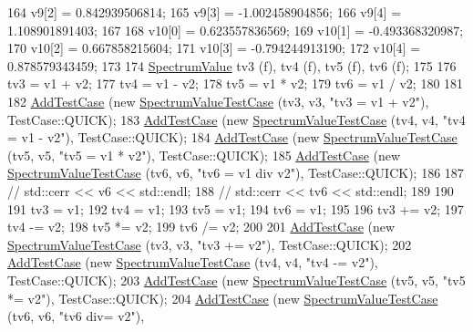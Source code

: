 \begin{DoxyCode}
164   v9[2] =  0.842939506814;
165   v9[3] = -1.002458904856;
166   v9[4] =  1.108901891403;
167 
168   v10[0] =  0.623557836569;
169   v10[1] = -0.493368320987;
170   v10[2] =  0.667858215604;
171   v10[3] = -0.794244913190;
172   v10[4] =  0.878579343459;
173 
174   \hyperlink{classns3_1_1SpectrumValue}{SpectrumValue} tv3 (f), tv4 (f), tv5 (f), tv6 (f);
175 
176   tv3 = v1 + v2;
177   tv4 = v1 - v2;
178   tv5 = v1 * v2;
179   tv6 = v1 / v2;
180 
181 
182   \hyperlink{classns3_1_1TestCase_a3718088e3eefd5d6454569d2e0ddd835}{AddTestCase} (\textcolor{keyword}{new} \hyperlink{classSpectrumValueTestCase}{SpectrumValueTestCase} (tv3, v3, \textcolor{stringliteral}{"tv3 = v1 + v2"}), 
      TestCase::QUICK);
183   \hyperlink{classns3_1_1TestCase_a3718088e3eefd5d6454569d2e0ddd835}{AddTestCase} (\textcolor{keyword}{new} \hyperlink{classSpectrumValueTestCase}{SpectrumValueTestCase} (tv4, v4, \textcolor{stringliteral}{"tv4 = v1 - v2"}), 
      TestCase::QUICK);
184   \hyperlink{classns3_1_1TestCase_a3718088e3eefd5d6454569d2e0ddd835}{AddTestCase} (\textcolor{keyword}{new} \hyperlink{classSpectrumValueTestCase}{SpectrumValueTestCase} (tv5, v5, \textcolor{stringliteral}{"tv5 = v1 * v2"}), 
      TestCase::QUICK);
185   \hyperlink{classns3_1_1TestCase_a3718088e3eefd5d6454569d2e0ddd835}{AddTestCase} (\textcolor{keyword}{new} \hyperlink{classSpectrumValueTestCase}{SpectrumValueTestCase} (tv6, v6, \textcolor{stringliteral}{"tv6 = v1 div v2"}), 
      TestCase::QUICK);
186 
187   \textcolor{comment}{// std::cerr << v6 << std::endl;}
188   \textcolor{comment}{// std::cerr << tv6 << std::endl;}
189 
190 
191   tv3 = v1;
192   tv4 = v1;
193   tv5 = v1;
194   tv6 = v1;
195 
196   tv3 += v2;
197   tv4 -= v2;
198   tv5 *= v2;
199   tv6 /= v2;
200 
201   \hyperlink{classns3_1_1TestCase_a3718088e3eefd5d6454569d2e0ddd835}{AddTestCase} (\textcolor{keyword}{new} \hyperlink{classSpectrumValueTestCase}{SpectrumValueTestCase} (tv3, v3, \textcolor{stringliteral}{"tv3 += v2"}), 
      TestCase::QUICK);
202   \hyperlink{classns3_1_1TestCase_a3718088e3eefd5d6454569d2e0ddd835}{AddTestCase} (\textcolor{keyword}{new} \hyperlink{classSpectrumValueTestCase}{SpectrumValueTestCase} (tv4, v4, \textcolor{stringliteral}{"tv4 -= v2"}), 
      TestCase::QUICK);
203   \hyperlink{classns3_1_1TestCase_a3718088e3eefd5d6454569d2e0ddd835}{AddTestCase} (\textcolor{keyword}{new} \hyperlink{classSpectrumValueTestCase}{SpectrumValueTestCase} (tv5, v5, \textcolor{stringliteral}{"tv5 *= v2"}), 
      TestCase::QUICK);
204   \hyperlink{classns3_1_1TestCase_a3718088e3eefd5d6454569d2e0ddd835}{AddTestCase} (\textcolor{keyword}{new} \hyperlink{classSpectrumValueTestCase}{SpectrumValueTestCase} (tv6, v6, \textcolor{stringliteral}{"tv6 div= v2"}), 

\end{DoxyCode}
